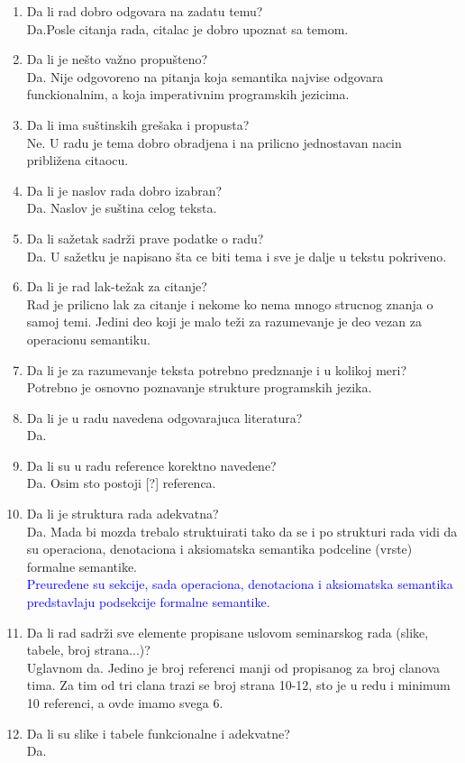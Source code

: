 \documentclass[a4paper]{report}
\newcommand{\odgovor}[1]{\textcolor{blue}{#1}}
\begin{document}
\begin{enumerate}
\item Da li rad dobro odgovara na zadatu temu?\\
Da.Posle citanja rada, citalac je dobro upoznat sa temom.
\item Da li je nešto važno propušteno?\\
Da. Nije odgovoreno na pitanja koja semantika najvise odgovara funckionalnim, a koja imperativnim programskih jezicima.
\item Da li ima suštinskih grešaka i propusta?\\
Ne. U radu je tema dobro obradjena i na prilicno jednostavan nacin približena citaocu.
\item Da li je naslov rada dobro izabran?\\
Da. Naslov je suština celog teksta.
\item Da li sažetak sadrži prave podatke o radu?\\
Da. U sažetku je napisano šta ce biti tema i sve je dalje u tekstu pokriveno.
\item Da li je rad lak-težak za citanje?\\
Rad je prilicno lak za citanje i nekome ko nema mnogo strucnog znanja o samoj temi. Jedini deo koji je malo teži za razumevanje je deo vezan za operacionu semantiku.
\item Da li je za razumevanje teksta potrebno predznanje i u kolikoj meri?\\
Potrebno je osnovno poznavanje strukture programskih jezika.
\item Da li je u radu navedena odgovarajuca literatura?\\
Da.
\item Da li su u radu reference korektno navedene?\\
Da. Osim sto postoji [?] referenca. 
\item Da li je struktura rada adekvatna?\\
Da. Mada bi mozda trebalo struktuirati tako da se i po strukturi rada vidi da su operaciona, denotaciona i aksiomatska semantika podceline (vrste) formalne semantike.\\
\odgovor{Preuređene su sekcije, sada operaciona, denotaciona i aksiomatska semantika predstavlaju podsekcije formalne semantike.}
\item Da li rad sadrži sve elemente propisane uslovom seminarskog rada (slike, tabele, broj strana...)?\\
Uglavnom da. Jedino je broj referenci manji od propisanog za broj clanova tima. Za tim od tri clana trazi se broj strana 10-12, sto je u redu i minimum 10 referenci, a ovde imamo svega 6.
\item Da li su slike i tabele funkcionalne i adekvatne?\\
Da.
\end{enumerate}
\end{document}
